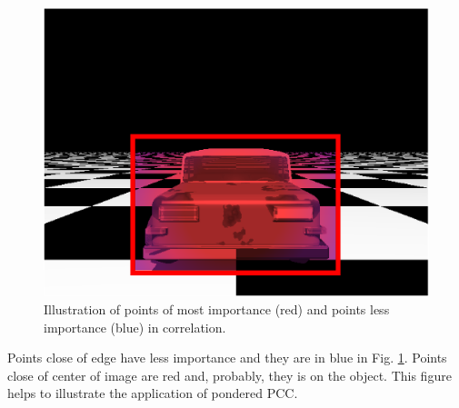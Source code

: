 \begin{figure}[H]
\includegraphics[width=\columnwidth]{images/imageErrorcontroled.eps}
\caption{Illustration of points of most importance (red) and points less importance (blue) in correlation.}
\label{fig:errorpondered}
\end{figure}

Points close of edge have less importance and they are in blue in Fig. \ref{fig:errorpondered}. 
Points close of center of image are red and, probably, they is on the object. This figure helps 
to illustrate the application of pondered PCC.